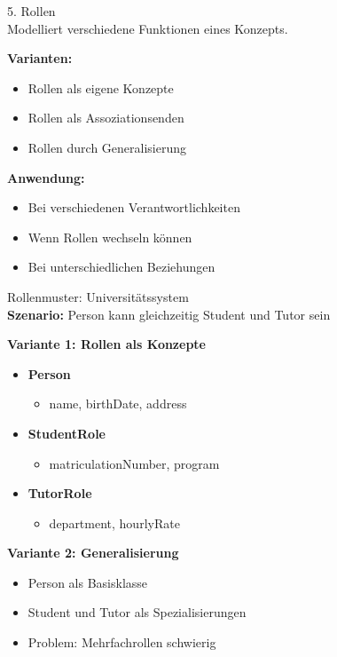 \begin{concept}{5. Rollen}\\
Modelliert verschiedene Funktionen eines Konzepts.

\textbf{Varianten:}
\begin{itemize}
    \item Rollen als eigene Konzepte
    \item Rollen als Assoziationsenden
    \item Rollen durch Generalisierung
\end{itemize}

\textbf{Anwendung:}
\begin{itemize}
    \item Bei verschiedenen Verantwortlichkeiten
    \item Wenn Rollen wechseln können
    \item Bei unterschiedlichen Beziehungen
\end{itemize}
\end{concept}

\begin{example2}{Rollenmuster: Universitätssystem}\\
\textbf{Szenario:} Person kann gleichzeitig Student und Tutor sein

\textbf{Variante 1: Rollen als Konzepte}
\begin{itemize}
    \item \textbf{Person}
    \begin{itemize}
        \item name, birthDate, address
    \end{itemize}
    \item \textbf{StudentRole}
    \begin{itemize}
        \item matriculationNumber, program
    \end{itemize}
    \item \textbf{TutorRole}
    \begin{itemize}
        \item department, hourlyRate
    \end{itemize}
\end{itemize}

\textbf{Variante 2: Generalisierung}
\begin{itemize}
    \item Person als Basisklasse
    \item Student und Tutor als Spezialisierungen
    \item Problem: Mehrfachrollen schwierig
\end{itemize}
\end{example2}


